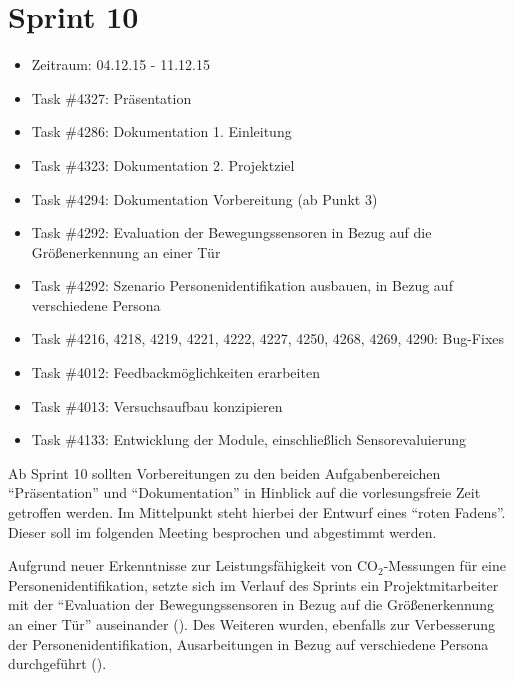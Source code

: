 \documentclass[12pt, oneside, smallheadings]{scrbook}
\begin{document}
\section{Sprint 10}
\begin{itemize}
	\item Zeitraum: 04.12.15 - 11.12.15 \newline
	\item Task \#4327: Präsentation
	\item Task \#4286: Dokumentation 1. Einleitung
	\item Task \#4323: Dokumentation 2. Projektziel
	\item Task \#4294: Dokumentation Vorbereitung (ab Punkt 3)
	\item Task \#4292: Evaluation der Bewegungssensoren in Bezug auf die Größenerkennung an einer Tür
	\item Task \#4292: Szenario Personenidentifikation ausbauen, in Bezug auf verschiedene Persona
	\item Task \#4216, 4218, 4219, 4221, 4222, 4227, 4250, 4268, 4269, 4290: Bug-Fixes
	\item Task \#4012: Feedbackmöglichkeiten erarbeiten
	\item Task \#4013: Versuchsaufbau konzipieren
	\item Task \#4133: Entwicklung der Module, einschließlich Sensorevaluierung\\
\end{itemize}
\noindent
Ab Sprint 10 sollten Vorbereitungen zu den beiden Aufgabenbereichen "`Präsentation"' und "`Dokumentation"' in Hinblick auf die vorlesungsfreie Zeit getroffen werden. Im Mittelpunkt steht hierbei der Entwurf eines "`roten Fadens"'. Dieser soll im folgenden Meeting besprochen und abgestimmt werden.

Aufgrund neuer Erkenntnisse zur Leistungsfähigkeit von CO$_2$-Messungen für eine Personenidentifikation, setzte sich im Verlauf des Sprints ein Projektmitarbeiter mit der "`Evaluation der Bewegungssensoren in Bezug auf die Größenerkennung an einer Tür"' auseinander (). Des Weiteren wurden, ebenfalls zur Verbesserung der Personenidentifikation, Ausarbeitungen in Bezug auf verschiedene Persona durchgeführt ().
\end{document}
